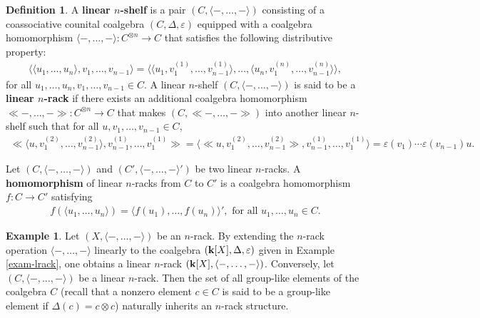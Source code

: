 \documentclass[a4paper,reqno,10pt]{amsart}
\theoremstyle{plain}
\theoremstyle{definition}
\newtheorem{defn}[thm]{Definition}
\newtheorem{exam}[thm]{Example}
\theoremstyle{remark}
\begin{document}
\begin{defn}
    A {\bf linear $n$-shelf} is a pair $(C, \langle -, \ldots, - \rangle)$ consisting of a coassociative counital coalgebra $(C, \Delta, \varepsilon)$ equipped with a coalgebra homomorphism $\langle -, \ldots, - \rangle : C^{\otimes n} \rightarrow C$ that satisfies the following distributive property:
    \begin{align}\label{self-dis}
        \langle \langle u_1, \ldots, u_n \rangle, v_1, \ldots, v_{n-1} \rangle = \langle \langle u_1, v_1^{(1)}, \ldots, v^{(1)}_{n-1} \rangle, \ldots , \langle u_n, v_1^{(n)}, \ldots, v^{(n)}_{n-1} \rangle \rangle,
    \end{align}
for all $u_1, \ldots, u_n, v_1, \ldots, v_{n-1} \in C$. A linear $n$-shelf $(C, \langle -, \ldots, - \rangle)$ is said to be a {\bf linear $n$-rack} if there exists an additional coalgebra homomorphism $\ll -, \ldots, - \gg : C^{\otimes n}  \rightarrow C$ that makes $(C, \ll -, \ldots, - \gg)$ into another linear $n$-shelf such that for all $u, v_1, \ldots, v_{n-1} \in C$,
    \begin{align}\label{inv-prop}
        \ll \langle u, v_1^{(2)}, \ldots, v_{n-1}^{(2)} \rangle, v_{n-1}^{(1)}, \ldots, v_1^{(1)} \gg = \langle \ll u, v_1^{(2)}, \ldots, v_{n-1}^{(2)} \gg , v_{n-1}^{(1)}, \ldots, v_1^{(1)} \rangle = \varepsilon (v_1) \cdots \varepsilon (v_{n-1}) u.
    \end{align}
\end{defn}

Let $(C, \langle -, \ldots, - \rangle)$ and $(C', \langle -, \ldots, - \rangle')$ be two linear $n$-racks. A {\bf homomorphism} of linear $n$-racks from $C$ to $C'$ is a coalgebra homomorphism $f : C \rightarrow C'$ satisfying
\begin{align*}
    f ( \langle u_1, \ldots, u_n \rangle ) = \langle f(u_1), \ldots, f(u_n) \rangle', \text{ for all } u_1, \ldots, u_n \in C.
\end{align*}

\begin{exam}\label{exam-20}
    Let $(X, \langle -, \ldots, - \rangle)$ be an $n$-rack. By extending the $n$-rack operation $\langle -, \ldots, - \rangle$ linearly to the coalgebra $({\bf k} [X], \Delta, \varepsilon)$ given in Example \ref{exam-lrack}, one obtains a linear $n$-rack $({\bf k}[X], \langle -, \ldots, - \rangle)$. Conversely, let $(C, \langle -, \ldots, - \rangle)$ be a linear $n$-rack. Then the set of all group-like elements of the coalgebra $C$ (recall that a nonzero element $c \in C$ is said to be a group-like element if $\Delta (c) = c \otimes c$) naturally inherits an $n$-rack structure.
\end{exam}
\end{document}
